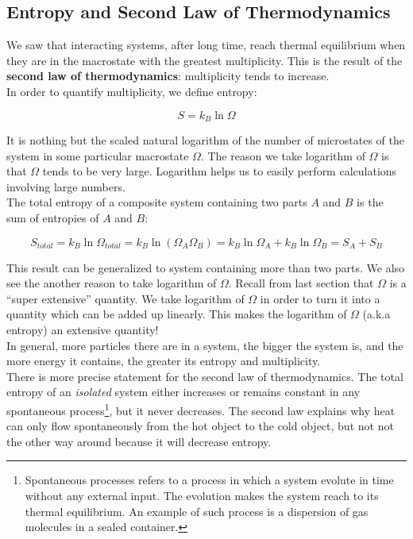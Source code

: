 \documentclass[12pt, a4paper]{article}
\newcounter{exa}
\begin{document}
\subsection{Entropy and Second Law of Thermodynamics}

We saw that interacting systems, after long time, reach thermal equilibrium when they are in the macrostate with the greatest multiplicity. This is the result of the \textbf{second law of thermodynamics}: multiplicity tends to increase. \\

In order to quantify multiplicity, we define entropy:

\[ S=k_B\ln\Omega \]

It is nothing but the scaled natural logarithm of the number of microstates of the system in some particular macrostate $\Omega$. The reason we take logarithm of $\Omega$ is that $\Omega$ tends to be very large. Logarithm helps us to easily perform calculations involving large numbers. \\

The total entropy of a composite system containing two parts $A$ and $B$ is the sum of entropies of $A$ and $B$:

\[S_{total}=k_B\ln\Omega_{total}=k_B\ln(\Omega_A\Omega_B)=k_B\ln\Omega_A+k_B\ln\Omega_B=S_A+S_B\]

This result can be generalized to system containing more than two parts. We also see the another reason to take logarithm of $\Omega$. Recall from last section that $\Omega$ is a ``super extensive'' quantity. We take logarithm of $\Omega$ in order to turn it into a quantity which can be added up linearly. This makes the logarithm of $\Omega$ (a.k.a entropy) an extensive quantity! \\

In general, more particles there are in a system, the bigger the system is, and the more energy it contains, the greater its entropy and multiplicity. \\

There is more precise statement for the second law of thermodynamics. The total entropy of an \textit{isolated} system either increases or remains constant in any spontaneous process\footnote{Spontaneous processes refers to a process in which a system evolute in time without any external input. The evolution makes the system reach to its thermal equilibrium. An example of such process is a dispersion of gas molecules in a sealed container.}, but it never decreases. The second law explains why heat can only flow spontaneously from the hot object to the cold object, but not not the other way around because it will decrease entropy. \\
\end{document}
